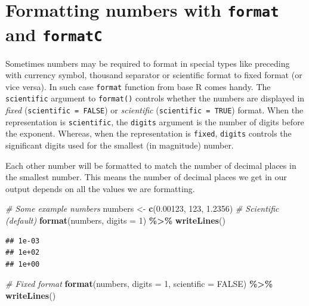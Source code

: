 \documentclass[
]{book}
\newenvironment{Shaded}{\begin{snugshade}}{\end{snugshade}}
\newcommand{\AttributeTok}[1]{\textcolor[rgb]{0.13,0.29,0.53}{#1}}
\newcommand{\CommentTok}[1]{\textcolor[rgb]{0.56,0.35,0.01}{\textit{#1}}}
\newcommand{\ConstantTok}[1]{\textcolor[rgb]{0.56,0.35,0.01}{#1}}
\newcommand{\DecValTok}[1]{\textcolor[rgb]{0.00,0.00,0.81}{#1}}
\newcommand{\FloatTok}[1]{\textcolor[rgb]{0.00,0.00,0.81}{#1}}
\newcommand{\FunctionTok}[1]{\textcolor[rgb]{0.13,0.29,0.53}{\textbf{#1}}}
\newcommand{\NormalTok}[1]{#1}
\newcommand{\OtherTok}[1]{\textcolor[rgb]{0.56,0.35,0.01}{#1}}
\newcommand{\SpecialCharTok}[1]{\textcolor[rgb]{0.81,0.36,0.00}{\textbf{#1}}}
\begin{document}
\hypertarget{formatting-numbers-with-format-and-formatc}{%
\section{\texorpdfstring{Formatting numbers with \texttt{format} and \texttt{formatC}}{Formatting numbers with format and formatC}}\label{formatting-numbers-with-format-and-formatc}}

Sometimes numbers may be required to format in special types like preceding with currency symbol, thousand separator or scientific format to fixed format (or vice versa). In such case \texttt{format} function from base R comes handy. The \texttt{scientific} argument to \texttt{format()} controls whether the numbers are displayed in \emph{fixed} (\texttt{scientific\ =\ FALSE}) or \emph{scientific} (\texttt{scientific\ =\ TRUE}) format. When the representation is \texttt{scientific}, the \texttt{digits} argument is the number of digits before the exponent. Whereas, when the representation is \texttt{fixed}, \texttt{digits} controls the significant digits used for the smallest (in magnitude) number.

Each other number will be formatted to match the number of decimal places in the smallest number. This means the number of decimal places we get in our output depends on all the values we are formatting.

\begin{Shaded}
\begin{Highlighting}[]
\CommentTok{\# Some example numbers}
\NormalTok{numbers }\OtherTok{\textless{}{-}} \FunctionTok{c}\NormalTok{(}\FloatTok{0.00123}\NormalTok{, }\DecValTok{123}\NormalTok{, }\FloatTok{1.2356}\NormalTok{)}
\CommentTok{\# Scientific (default)}
\FunctionTok{format}\NormalTok{(numbers, }\AttributeTok{digits =} \DecValTok{1}\NormalTok{) }\SpecialCharTok{\%\textgreater{}\%} 
  \FunctionTok{writeLines}\NormalTok{()}
\end{Highlighting}
\end{Shaded}

\begin{verbatim}
## 1e-03
## 1e+02
## 1e+00
\end{verbatim}

\begin{Shaded}
\begin{Highlighting}[]
\CommentTok{\# Fixed format}
\FunctionTok{format}\NormalTok{(numbers, }\AttributeTok{digits =} \DecValTok{1}\NormalTok{, }\AttributeTok{scientific =} \ConstantTok{FALSE}\NormalTok{) }\SpecialCharTok{\%\textgreater{}\%} 
  \FunctionTok{writeLines}\NormalTok{()}
\end{Highlighting}
\end{Shaded}
\end{document}
